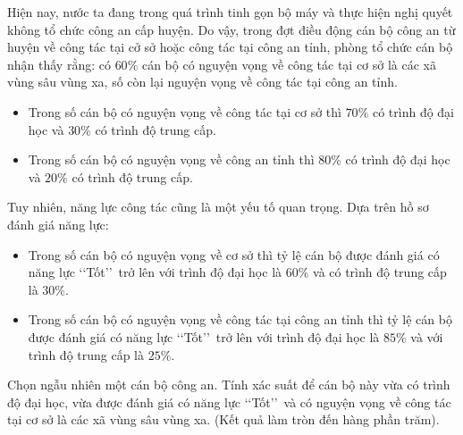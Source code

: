 \begin{bt}%
	Hiện nay, nước ta đang trong quá trình tinh gọn bộ máy và thực hiện nghị quyết không tổ chức công an cấp huyện. Do vậy, trong đợt điều động cán bộ công an từ huyện về công tác tại cở sở hoặc công tác tại công an tỉnh, phòng tổ chức cán bộ nhận thấy rằng: có $60\%$ cán bộ có nguyện vọng về công tác tại cơ sở là  các xã vùng sâu vùng xa, số còn lại nguyện vọng về công tác tại công an tỉnh.
	\begin{itemize}
		\item Trong số cán bộ có nguyện vọng về công tác tại  cơ sở thì $70\%$ có trình độ đại học và $30\%$ có trình độ trung cấp.
		 \item Trong số cán bộ có nguyện vọng về công an tỉnh thì $80\%$ có trình độ đại học và $20\%$ có trình độ trung cấp.
	\end{itemize}
	Tuy nhiên, năng lực công tác cũng là một yếu tố quan trọng.  Dựa trên hồ sơ đánh giá năng lực:
	\begin{itemize}
		\item Trong số cán bộ có nguyện vọng về cơ sở thì tỷ lệ cán bộ được đánh giá có năng lực \lq\lq Tốt\rq\rq\, trở lên với trình độ đại học là $60\%$  và có trình độ trung cấp là $30\%$.
		\item Trong số cán bộ có nguyện vọng về công tác tại công an tỉnh thì tỷ lệ  cán bộ được đánh giá có năng lực \lq\lq Tốt\rq\rq\, trở lên với trình độ đại học là $85\%$ và với trình độ trung cấp là $25\%$.
	\end{itemize}
	Chọn ngẫu nhiên một cán bộ công an. Tính xác suất để cán bộ này vừa có trình độ đại học, vừa được  đánh giá có năng lực \lq\lq Tốt\rq\rq\, và có nguyện vọng về công tác tại cơ sở là các xã vùng sâu vùng xa. (Kết quả làm tròn đến hàng phần trăm).
\end{bt}
